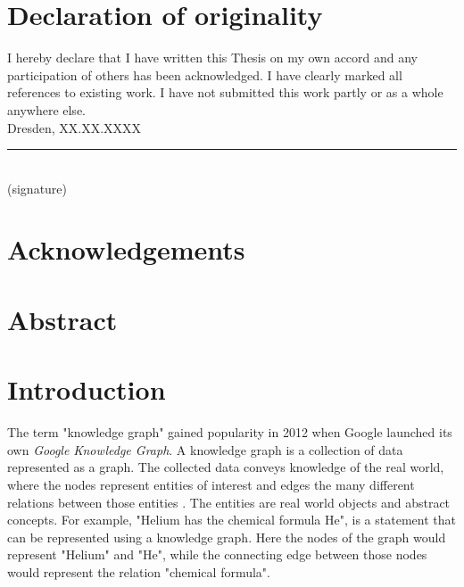 \documentclass[12 pt, a4paper]{report}
\theoremstyle{definition}
\newcommand{\blankpage}{
\newpage
\thispagestyle{empty}
\addtocounter{page}{-1}
\mbox{}
\newpage
}
\begin{document}
\sloppy

\blankpage

\section*{Declaration of originality}
I hereby declare that I have written this Thesis on my own accord and any participation of others has been acknowledged. I have clearly marked all references to existing work. I have not submitted this work partly or as a whole anywhere else. \\

Dresden, XX.XX.XXXX \\
\rule{150 px}{0.5 px} \\
(signature)
\blankpage

\section*{Acknowledgements}
\lipsum[1]
\blankpage

%

\section*{Abstract}
\lipsum[1]

\tableofcontents
\pagebreak

{}
\section{Introduction}

The term "knowledge graph" gained popularity in 2012 when Google launched its own \textit{Google Knowledge Graph}. A knowledge graph is a collection of data represented as a graph. The collected data conveys knowledge of the real world, where the nodes represent entities of interest and edges the many different relations between those entities \cite{Hogan2021}. The entities are real world objects and abstract concepts. For example, "Helium has the chemical formula He", is a statement that can be represented using a knowledge graph. Here the nodes of the graph would represent "Helium" and "He", while the connecting edge between those nodes would represent the relation "chemical formula". 
\end{document}
